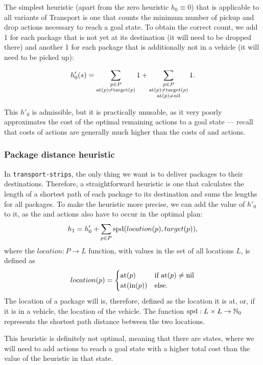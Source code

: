 The simplest heuristic (apart from the zero heuristic $h_0 \equiv 0$) that is applicable to all variants of Transport
is one that counts the minimum number of pickup and drop
actions necessary to reach a goal state.
To obtain the correct count, we add 1 for each
package that is not yet at its destination (it will need to be dropped there) and another 1 for each package
that is additionally not in a vehicle (it will need to be picked up):

$$h'_{0}(s) = \sum_{\substack{
p \in P\\ \textrm{at}(p) \neq \textrm{target}(p)}} 1
+ \sum_{\substack{
p \in P\\ \textrm{at}(p) \neq \textrm{target}(p)\\
\textrm{at}(p) \neq \textrm{nil}}} 1.$$

This $h'_0$ is admissible, but it is practically unusable, as it
very poorly approximates 
the cost of the optimal remaining actions to a goal state
--- recall that costs of \drive{} actions are generally much higher than the costs of \pickup{} and \drop{} actions.

\subsubsection{Package distance heuristic}\label{sfa1}

In \texttt{transport-strips}, the only thing we want is to deliver packages to their destinations. Therefore, a straightforward heuristic is one that calculates the length of a shortest
path of each package to its destination and sums the lengths for all packages.
To make the heuristic more precise, we can add the
value of $h'_0$ to it, as the \pickup{} and \drop{}
actions also have to occur in the optimal plan:
$$h_1 = h'_0 + \sum_{p \in P} \textrm{spd}(location(p), target(p)),$$
where the $location: P \to L$ function,
with values in the set of all locations $L$, is defined as
$$location(p) = \begin{cases} 
   \textrm{at}(p) & \text{if } \textrm{at}(p) \neq \textrm{nil}\\
   \textrm{at}(\textrm{in}(p)) & \text{else}.
  \end{cases}$$
The location of a package will is, therefore, defined
as the location it is at, or, if it is in a vehicle,
the location of the vehicle.
The function $\textrm{spd}: L \times L \to \mathbb{N}_0$ represents
the shortest path distance between the two locations.

This heuristic is definitely not optimal, meaning that there are states,
where we will need to add actions to reach a goal state with a higher total cost than the value of the heuristic in that state.

